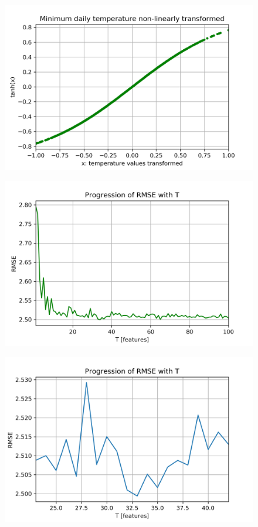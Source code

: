 \documentclass[a4paper]{article}
\begin{document}
\begin{figure}[ht]
    \centering
    \includegraphics[width=12cm]{figure_3_tanh_dataset}
    \caption{}
    \label{fig:pre-ex2-3}
\end{figure}




\begin{figure}[ht]
    \centering
    \includegraphics[width=12cm]{figure_1_rmse_with_T}
    \caption{}
    \label{fig:ex2-1}
\end{figure}

\begin{figure}[ht]
    \centering
    \includegraphics[width=12cm]{figure_2__rmse_with_T_zoom}
    \caption{}
    \label{fig:ex2-2}
\end{figure}
\end{document}

